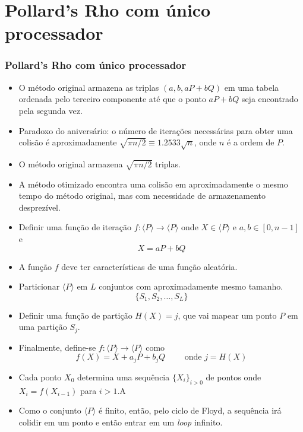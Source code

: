 \documentclass{beamer}
\begin{document}
\section{Pollard's Rho com único processador}
\begin{frame}
\frametitle{Pollard's Rho com único processador}
  \begin{itemize}
    \item O método original armazena as triplas $(a,b,aP + bQ)$ em uma tabela ordenada pelo terceiro componente até que o ponto $aP+bQ$ seja encontrado pela segunda vez.
    \item Paradoxo do aniversário: o número de iterações necessárias para obter uma colisão é aproximadamente $\sqrt{\pi n / 2} \equiv 1.2533\sqrt{n}$, onde $n$ é a ordem de $P$.
    \item O método original armazena $\sqrt{\pi n / 2}$ triplas.
  \end{itemize} 
\end{frame}
\begin{frame}
  \begin{itemize}
    \item A método otimizado encontra uma colisão em aproximadamente o mesmo tempo do método original, mas com necessidade de armazenamento desprezível.
    \item Definir uma função de iteração $f: \langle P \rangle \to \langle P \rangle$ onde $X \in \langle P \rangle$ e $a,b \in [0,n-1]$ e
    $$
      X = aP + bQ
    $$
    \item A função $f$ deve ter características de uma função aleatória.
    \item Particionar $\langle P \rangle$ em $L$ conjuntos com aproximadamente mesmo tamanho.
    $$
      \{S_1, S_2, \dots, S_L\}
    $$
    \item Definir uma função de partição $H(X) = j$, que vai mapear um ponto $P$ em uma partição $S_j$.
  \end{itemize}
\end{frame}
\begin{frame}
  \begin{itemize}
    \item Finalmente, define-se $f: \langle P \rangle \to \langle P \rangle$ como
    $$
      f(X) = X + a_jP + b_jQ \qquad\mbox{ onde } j = H(X)
    $$
    \item Cada ponto $X_0$ determina uma sequência $\{X_i\}_{i>0}$ de pontos onde $X_i = f(X_{i-1})$ para $i>1$.A
    \item Como o conjunto $\langle P \rangle$ é finito, então, pelo ciclo de Floyd, a sequência irá colidir em um ponto e então entrar em um \textit{loop} infinito.
  \end{itemize}
\end{frame}
\end{document}
